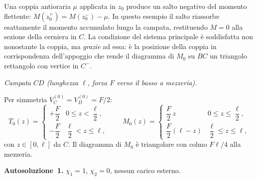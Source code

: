 \begin{oss}
Una coppia antioraria $\mu$ applicata in $z_0$ produce
un salto negativo del momento flettente:
$M(z_0^+) = M(z_0^-) - \mu$.
In questo esempio il salto riassorbe esattamente
il momento accumulato lungo la campata, restituendo
$M = 0$ alla sezione della cerniera in $C$.
La condizione del sistema principale è soddisfatta
non nonostante la coppia, ma \emph{grazie} ad essa:
è la posizione della coppia in corrispondenza
dell'appoggio che rende il diagramma di $M_0$
su $BC$ un triangolo rettangolo con vertice in $C^-$.
\end{oss}

\medskip
\noindent\textit{Campata $CD$
(lunghezza $\ell$, forza $F$ verso il basso a mezzeria).}

\noindent Per simmetria $V_C^{(0)} = V_D^{(0)} = F/2$:
\[
T_0(z) = \begin{cases}
+\dfrac{F}{2} & 0 \le z < \dfrac{\ell}{2}, \\[8pt]
-\dfrac{F}{2} & \dfrac{\ell}{2} < z \le \ell,
\end{cases}
\qquad
M_0(z) = \begin{cases}
\dfrac{F}{2}\,z & 0 \le z \le \dfrac{\ell}{2}, \\[8pt]
\dfrac{F}{2}(\ell - z) & \dfrac{\ell}{2} \le z \le \ell,
\end{cases}
\]
con $z \in [0,\ell]$ da $C$. Il diagramma di $M_0$ è
triangolare con colmo $F\ell/4$ alla mezzeria.

\medskip
\noindent\textbf{Autosoluzione~1.}
$\chi_1 = 1$, $\chi_2 = 0$, nessun carico esterno.

